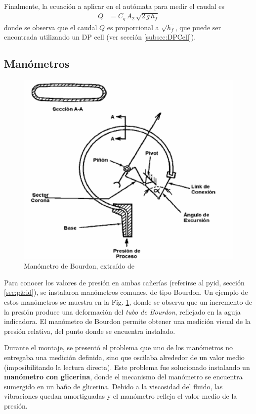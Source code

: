 Finalmente, la ecuación a aplicar en el autómata para medir el caudal es
\begin{align}
 Q &= C_q\,A_2\, \sqrt{2\,g\,h_f}
\end{align}
donde se observa que el caudal $Q$ es proporcional a $\sqrt{h_f}$, que puede
ser encontrada utilizando un DP cell (ver sección \ref{subsec:DPCell}).

\subsection{Manómetros}
\label{subsec:Manometros}

\begin{figure}[ht]
 \centering
 \includegraphics[width=.7\textwidth]{Cap2-DisenoEnsamblado/images/manomBourdon.png}
 \caption{Manómetro de Bourdon, extraído de \cite{bib:ApuntesPuglesiPlacaOrif}}
 \label{fig:manometroBourdon}
\end{figure}

Para conocer los valores de presión en ambas cañerías
(referirse al \gls{pyid}, sección \ref{sec:p&id}),
se instalaron manómetros comunes, de tipo Bourdon. 
Un ejemplo de estos manómetros se muestra en la Fig. \ref{fig:manometroBourdon},
donde se observa que un incremento de la presión produce una deformación 
del \emph{tubo de Bourdon}, reflejado en la aguja indicadora.
El manómetro de Bourdon permite obtener una medición visual de la
presión relativa, del punto donde se encuentra instalado.

Durante el montaje, se presentó el problema que uno de los manómetros
no entregaba una medición definida, sino que oscilaba alrededor de un
valor medio (imposibilitando la lectura directa).
Este problema fue solucionado instalando un \textbf{manómetro con glicerina},
donde el mecanismo del manómetro se encuentra sumergido en un baño de glicerina.
Debido a la viscosidad del fluido, las vibraciones quedan amortiguadas
y el manómetro refleja el valor medio de la presión.
